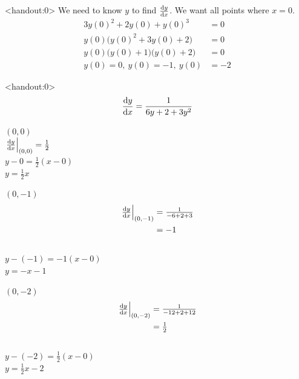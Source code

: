 \begin{frame}<handout:0>
\color{answercolor}
We need to know $y$ to find $\frac{\text{d}y}{\text{d}x}$. We want all points where $x=0$.
\begin{align*}
3y(0)^2+2y(0)+y(0)^3&=0\\
y(0)\big(y(0)^2+3y(0)+2\big)&=0\\
y(0)\big(y(0)+1\big)\big(y(0)+2\big)&=0\\
y(0)=0,\ y(0)=-1,\ y(0)&=-2
\end{align*}
\end{frame}
\begin{frame}<handout:0>
\color{answercolor}
\[\frac{\text{d}y}{\text{d}x}=\frac{1}{6y+2+3y^2} \]
\begin{multicols}{3}
	$(0,0)$\\[10pt]
	$\left.\frac{\text{d}y}{\text{d}x}\right|_{(0,0)}=\frac{1}{2}$\\
	$y-0=\frac12(x-0)$\\
	$y=\frac12x$
	\columnbreak
	
	$(0,-1)$\\[10pt]
	\begin{align*}\textstyle
          \left.\frac{\text{d}y}{\text{d}x}\right|_{(0,-1)}&=\textstyle\frac{1}{-6+2+3}\\
                        &=-1\end{align*}\\
         $y-(-1)=-1(x-0)$\\
         $y=-x-1$
	
	\columnbreak
	$(0,-2)$\\[10pt]
	\begin{align*}\textstyle\left.\frac{\text{d}y}{\text{d}x}\right|_{(0,-2)}
                           &=\textstyle\frac{1}{-12+2+12}\\
                           &=\textstyle\frac12\end{align*}\\
$y-(-2)=\frac12(x-0)$\\
$y=\frac12x-2$
	\end{multicols}
\end{frame}

